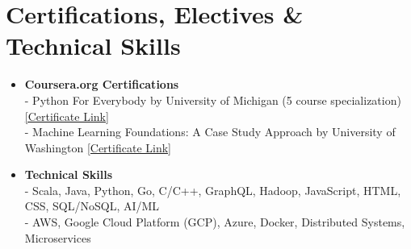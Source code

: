 \documentclass{article}
\begin{document}
\section*{Certifications, Electives \& Technical Skills}
\begin{itemize}
    \item \textbf{Coursera.org Certifications}\\
    - Python For Everybody by University of Michigan (5 course specialization) \href{https://www.coursera.org/account/accomplishments/specialization/2B5PCJGZ9WEE}{[Certificate Link]}\\
    - Machine Learning Foundations: A Case Study Approach by University of Washington \href{https://www.coursera.org/account/accomplishments/certificate/NDVXWMCYKX9N}{[Certificate Link]}
    
    \item \textbf{Technical Skills}\\
    - Scala, Java, Python, Go, C/C++, GraphQL, Hadoop, JavaScript, HTML, CSS, SQL/NoSQL, AI/ML\\
    - AWS, Google Cloud Platform (GCP), Azure, Docker, Distributed Systems, Microservices
\end{itemize}
\end{document}
